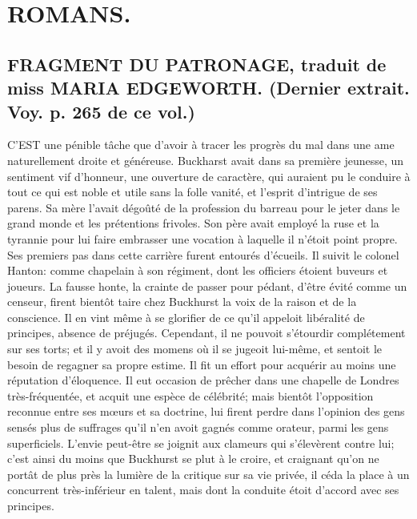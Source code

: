 \setcounter{page}{406}
\chapter{ROMANS.}
\section{FRAGMENT DU PATRONAGE, traduit de miss MARIA EDGEWORTH. \large{(Dernier extrait. Voy. p. 265 de ce vol.)}}
C'EST une pénible tâche que d'avoir à tracer les progrès du mal dans une ame naturellement droite et généreuse. Buckharst avait dans sa première jeunesse, un sentiment vif d'honneur, une ouverture de caractère, qui auraient pu le conduire à tout ce qui est noble et utile sans la folle vanité, et l'esprit d'intrigue de ses parens. Sa mère l'avait dégoûté de la profession du barreau pour le jeter dans le grand monde et les prétentions frivoles. Son père avait employé la ruse et la tyrannie pour lui faire embrasser une vocation à laquelle il n'étoit point propre. Ses premiers pas dans cette carrière furent entourés d'écueils. Il suivit le colonel Hanton:\setcounter{page}{407} comme chapelain à son régiment, dont les officiers étoient buveurs et joueurs. La fausse honte, la crainte de passer pour pédant, d'être évité comme un censeur, firent bientôt taire chez Buckhurst la voix de la raison et de la conscience. Il en vint même à se glorifier de ce qu'il appeloit libéralité de principes, absence de préjugés. Cependant, il ne
pouvoit s'étourdir complétement sur ses torts; et il y avoit des momens où il se jugeoit lui-même, et sentoit le besoin de regagner sa propre estime. Il fit un effort pour acquérir au moins une réputation d'éloquence. Il eut occasion de prêcher dans une chapelle de Londres très-fréquentée, et acquit une espèce de célébrité; mais bientôt l'opposition reconnue entre ses mœurs et sa doctrine, lui firent perdre dans l'opinion des gens sensés plus de suffrages qu'il n'en avoit gagnés comme orateur, parmi les gens superficiels. L'envie peut-être se joignit aux clameurs qui s'élevèrent contre lui; c'est ainsi du moins que Buckhurst se plut à le croire, et craignant qu'on ne portât de plus près la lumière de la critique sur sa vie privée, il céda la place à un concurrent très-inférieur
en talent, mais dont la conduite étoit d'accord avec ses principes.
